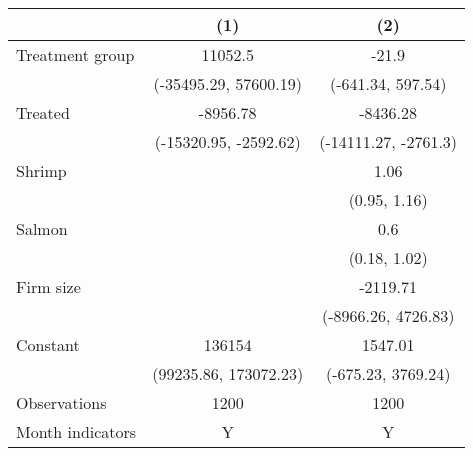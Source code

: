 \begin{tabular}{lcc}
\toprule
{} &                    (1) &                   (2) \\
\midrule
Treatment group  &                11052.5 &                 -21.9 \\
                 &  (-35495.29, 57600.19) &     (-641.34, 597.54) \\
Treated          &               -8956.78 &              -8436.28 \\
                 &  (-15320.95, -2592.62) &  (-14111.27, -2761.3) \\
Shrimp           &                        &                  1.06 \\
                 &                        &          (0.95, 1.16) \\
Salmon           &                        &                   0.6 \\
                 &                        &          (0.18, 1.02) \\
Firm size        &                        &              -2119.71 \\
                 &                        &   (-8966.26, 4726.83) \\
Constant         &                 136154 &               1547.01 \\
                 &  (99235.86, 173072.23) &    (-675.23, 3769.24) \\
Observations     &                   1200 &                  1200 \\
Month indicators &                      Y &                     Y \\
\bottomrule
\end{tabular}
